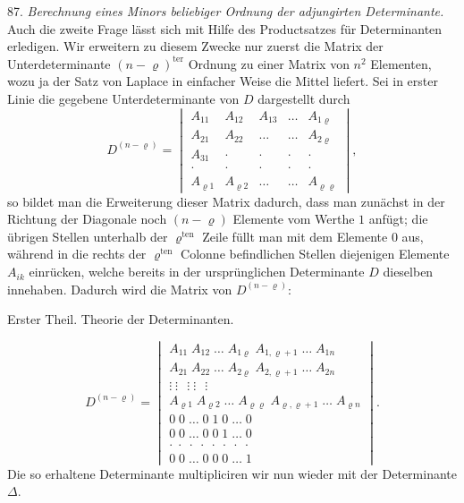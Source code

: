 \documentclass[11pt]{article}
\providecommand{\weberpage}[1]{}
\providecommand{\weq}[2]{\begin{equation}\tag{#1}#2\end{equation}}
\let\Delta\varDelta
\begin{document}
87. \textit{Berechnung eines Minors beliebiger Ordnung der adjungirten Determinante.} Auch die zweite Frage lässt sich mit Hilfe des Productsatzes für Determinanten erledigen. Wir erweitern zu diesem Zwecke nur zuerst die Matrix der Unterdeterminante $(n-\varrho)^{\text{ter}}$ Ordnung zu einer Matrix von $n^2$ Elementen, wozu ja der Satz von Laplace in einfacher Weise die Mittel liefert. Sei in erster Linie die gegebene Unterdeterminante von $D$ dargestellt durch
\[
D^{(n-\varrho)}=
\begin{vmatrix}
A_{11} & A_{12} & A_{13} & \ldots & A_{1\varrho} \\
A_{21} & A_{22} & \ldots & \ldots & A_{2\varrho} \\
A_{31} & \cdot & \cdot & \cdot & \cdot \\
\cdot & \cdot & \cdot & \cdot & \cdot \\
A_{\varrho 1} & A_{\varrho 2} & \ldots & \ldots & A_{\varrho\varrho}
\end{vmatrix},
\]
so bildet man die Erweiterung dieser Matrix dadurch, dass man zunächst in der Richtung der Diagonale noch $(n-\varrho)$ Elemente vom Werthe $1$ anfügt; die übrigen Stellen unterhalb der $\varrho^{\text{ten}}$ Zeile füllt man mit dem Elemente $0$ aus, während in die rechts der $\varrho^{\text{ten}}$ Colonne befindlichen Stellen diejenigen Elemente $A_{ik}$ einrücken, welche bereits in der ursprünglichen Determinante $D$ dieselben innehaben. Dadurch wird die Matrix von $D^{(n-\varrho)}$:


\weberpage{90}
Erster Theil. Theorie der Determinanten.

\weq{2}{D^{(n-\varrho)}=
\begin{vmatrix}
A_{11}\;A_{12}\;\ldots\;A_{1\varrho}\;A_{1,\varrho+1}\;\ldots\;A_{1n} \\
A_{21}\;A_{22}\;\ldots\;A_{2\varrho}\;A_{2,\varrho+1}\;\ldots\;A_{2n} \\
\vdots\;\vdots\;\ \ \vdots\;\vdots\;\ \ \vdots \\
A_{\varrho 1}\;A_{\varrho 2}\;\ldots\;A_{\varrho\varrho}\;A_{\varrho,\varrho+1}\;\ldots\;A_{\varrho n} \\
0\;0\;\ldots\;0\;1\;0\;\ldots\;0 \\
0\;0\;\ldots\;0\;0\;1\;\ldots\;0 \\
\cdot\;\cdot\;\cdot\;\cdot\;\cdot\;\cdot\;\cdot\;\cdot \\
0\;0\;\ldots\;0\;0\;0\;\ldots\;1
\end{vmatrix}.}
Die so erhaltene Determinante multipliciren wir nun wieder mit der Determinante $\Delta$.
\end{document}
